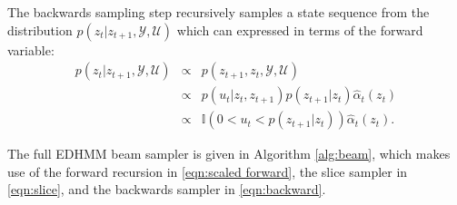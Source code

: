 

The backwards sampling step recursively samples a state sequence from the distribution $p(z_t | z_{t+1}, \mathcal{Y}, \mathcal{U})$
which can expressed in terms of the forward variable:
\begin{eqnarray}
    p(z_t | z_{t+1}, \mathcal{Y}, \mathcal{U}) &\propto& p(z_{t+1},z_t, \mathcal{Y}, \mathcal{U}) \nonumber \\
    & \propto &  
        p(u_{t} | z_t, z_{t+1})p(z_{t+1}|z_t) \hat{\alpha}_t(z_t)
        \nonumber\\
    & \propto & 
       \mathbb{I}(0 < u_{t} < p(z_{t+1} | z_t))
        \hat{\alpha}_t(z_t).
        \label{eqn:backward}
\end{eqnarray}


The full EDHMM beam sampler is given in Algorithm \ref{alg:beam}, which makes use of the forward recursion in \eqref{eqn:scaled forward}, the slice sampler in \eqref{eqn:slice}, and the backwards sampler in \eqref{eqn:backward}.

